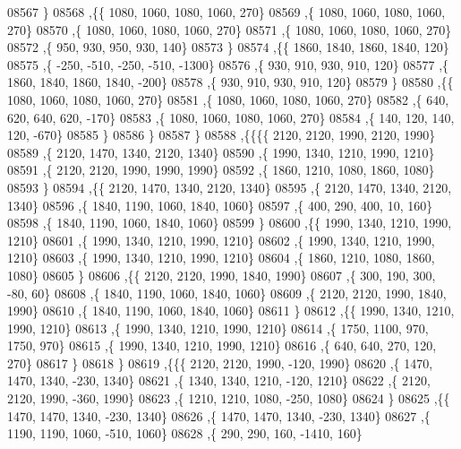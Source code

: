 \begin{DoxyCode}
08567     \}
08568    ,\{\{  1080,  1060,  1080,  1060,   270\}
08569     ,\{  1080,  1060,  1080,  1060,   270\}
08570     ,\{  1080,  1060,  1080,  1060,   270\}
08571     ,\{  1080,  1060,  1080,  1060,   270\}
08572     ,\{   950,   930,   950,   930,   140\}
08573     \}
08574    ,\{\{  1860,  1840,  1860,  1840,   120\}
08575     ,\{  -250,  -510,  -250,  -510, -1300\}
08576     ,\{   930,   910,   930,   910,   120\}
08577     ,\{  1860,  1840,  1860,  1840,  -200\}
08578     ,\{   930,   910,   930,   910,   120\}
08579     \}
08580    ,\{\{  1080,  1060,  1080,  1060,   270\}
08581     ,\{  1080,  1060,  1080,  1060,   270\}
08582     ,\{   640,   620,   640,   620,  -170\}
08583     ,\{  1080,  1060,  1080,  1060,   270\}
08584     ,\{   140,   120,   140,   120,  -670\}
08585     \}
08586    \}
08587   \}
08588  ,\{\{\{\{  2120,  2120,  1990,  2120,  1990\}
08589     ,\{  2120,  1470,  1340,  2120,  1340\}
08590     ,\{  1990,  1340,  1210,  1990,  1210\}
08591     ,\{  2120,  2120,  1990,  1990,  1990\}
08592     ,\{  1860,  1210,  1080,  1860,  1080\}
08593     \}
08594    ,\{\{  2120,  1470,  1340,  2120,  1340\}
08595     ,\{  2120,  1470,  1340,  2120,  1340\}
08596     ,\{  1840,  1190,  1060,  1840,  1060\}
08597     ,\{   400,   290,   400,    10,   160\}
08598     ,\{  1840,  1190,  1060,  1840,  1060\}
08599     \}
08600    ,\{\{  1990,  1340,  1210,  1990,  1210\}
08601     ,\{  1990,  1340,  1210,  1990,  1210\}
08602     ,\{  1990,  1340,  1210,  1990,  1210\}
08603     ,\{  1990,  1340,  1210,  1990,  1210\}
08604     ,\{  1860,  1210,  1080,  1860,  1080\}
08605     \}
08606    ,\{\{  2120,  2120,  1990,  1840,  1990\}
08607     ,\{   300,   190,   300,   -80,    60\}
08608     ,\{  1840,  1190,  1060,  1840,  1060\}
08609     ,\{  2120,  2120,  1990,  1840,  1990\}
08610     ,\{  1840,  1190,  1060,  1840,  1060\}
08611     \}
08612    ,\{\{  1990,  1340,  1210,  1990,  1210\}
08613     ,\{  1990,  1340,  1210,  1990,  1210\}
08614     ,\{  1750,  1100,   970,  1750,   970\}
08615     ,\{  1990,  1340,  1210,  1990,  1210\}
08616     ,\{   640,   640,   270,   120,   270\}
08617     \}
08618    \}
08619   ,\{\{\{  2120,  2120,  1990,  -120,  1990\}
08620     ,\{  1470,  1470,  1340,  -230,  1340\}
08621     ,\{  1340,  1340,  1210,  -120,  1210\}
08622     ,\{  2120,  2120,  1990,  -360,  1990\}
08623     ,\{  1210,  1210,  1080,  -250,  1080\}
08624     \}
08625    ,\{\{  1470,  1470,  1340,  -230,  1340\}
08626     ,\{  1470,  1470,  1340,  -230,  1340\}
08627     ,\{  1190,  1190,  1060,  -510,  1060\}
08628     ,\{   290,   290,   160, -1410,   160\}

\end{DoxyCode}
